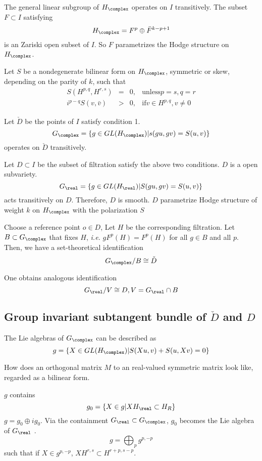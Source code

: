 \documentclass{article}
\begin{document}
The general linear subgroup of $H_{\complex}$ operates on $I$ transitively. 
The subset $F \subset I$ satisfying
\[
    H_{\complex} = F^p\oplus \bar{F}^{k-p+1}
\]
is an Zariski open subset of $I$. So $F$ parametrizes the Hodge structure on $H_{\complex}$.

Let $S$ be a nondegenerate bilinear form on $H_{\complex}$, symmetric or skew, depending
on the parity of $k$, such that 
\begin{align*}
    S(H^{p,q}, H^{r,s}) & = & 0, & \text{unless} p = s, q = r \\
    i^{p-q}S(v, \bar{v})& > & 0, & \text{if} v \in H^{p,q}, v\neq 0
\end{align*}

Let $\check{D}$ be the points of $I$ satisfy condition 1.
\[
    G_{\complex} = \{g \in GL(H_{\complex}) | s(gu, gv) = S(u, v)\}
\]
operates on $\check{D}$ transitively. 


Let $D \subset I$ be the subset of filtration satisfy the above two conditions.
$D$ is a open subvariety. 
\[
    G_{\real} = \{g\in GL(H_{\real}) | S(gu, gv) = S(u, v)\}
\]
acts transitively on $D$. Therefore, $D$ is smooth. $D$ parametrize Hodge 
structure of weight $k$ on $H_{\complex}$ with the polarization $S$

Choose a reference point $o \in D$, Let $H$ be the corresponding filtration.
Let $B \subset G_{\complex}$ that fixes $H$, \emph{i.e.} $gF^{p}(H) = F^{p}(H)$
for all $g\in B$ and all $p$. Then, we have a set-theoretical identification
\[
    G_{\complex}/B \cong \check{D}
\]

One obtains analogous identification
\[
    G_{\real}/V \cong D, V = G_{\real}\cap B
\]

\subsection{Group invariant subtangent bundle of $\check{D}$ and $D$}
The Lie algebras of $G_{\complex}$ can be described as
\[
    g = \{X \in GL(H_{\complex})|S(Xu, v) + S(u, Xv) = 0 \}
\]

How does an orthogonal matrix $M$ to an real-valued symmetric 
matrix look like, regarded as a bilinear form.

$g$ contains 
\[
    g_0 = \{X \in g | XH_{\real} \subset H_{R}\}
\]
$g = g_0\oplus ig_0$. Via the containment $G_{\real} \subset G_{\complex}$, $g_0$ 
becomes the Lie algebra of $G_{\real}$ . 
\[
    g = \bigoplus_p g^{p,-p}
\]
such that if $X \in g^{p,-p}$, $XH^{r,s} \subset H^{r+p, s-p}$. 
\end{document}
